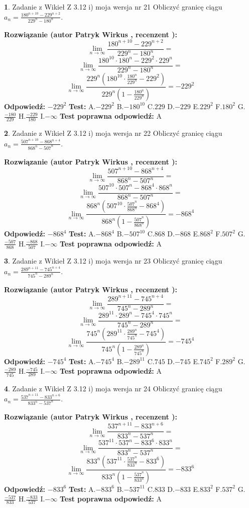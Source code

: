 \documentclass[12pt, a4paper]{article}
\theoremstyle{definition} %
\newtheorem{zad}{}
\newcommand{\zadStart}[1]{\begin{zad}#1\newline}
\newcommand{\zadStop}{\end{zad}}
\newcommand{\rozwStart}[2]{\noindent \textbf{Rozwiązanie (autor #1 , recenzent #2): }\newline}
\newcommand{\rozwStop}{\newline}
\newcommand{\odpStart}{\noindent \textbf{Odpowiedź:}\newline}
\newcommand{\odpStop}{\newline}
\newcommand{\testStart}{\noindent \textbf{Test:}\newline}
\newcommand{\testStop}{\newline}
\newcommand{\kluczStart}{\noindent \textbf{Test poprawna odpowiedź:}\newline}
\newcommand{\kluczStop}{\newline}
\begin{document}
\zadStart{Zadanie z Wikieł Z 3.12 i) moja wersja nr 21}
Obliczyć granicę ciągu $a_{n}=\frac{180^{n+10} - 229^{n+2}}{229^{n}-180^{n}}$.
\zadStop
\rozwStart{Patryk Wirkus}{}
$$\lim\limits_{n\to\infty}\frac{180^{n+10} - 229^{n+2}}{229^{n}-180^{n}}=$$
$$\lim\limits_{n\to\infty}\frac{180^{10} \cdot 180^{n} - 229^{2} \cdot 229^{n}}{229^{n}-180^{n}}=$$
$$\lim\limits_{n\to\infty}\frac{229^{n}(180^{10} \cdot \frac{180^{n}}{229^{n}} - 229^{2})}{229^{n}(1-\frac{180^{n}}{229^{n}})} = -229^{2}$$
\rozwStop
\odpStart
$-229^{2}$
\odpStop
\testStart
A.$-229^{2}$
B.$-180^{10}$
C.$229$
D.$-229$
E.$229^{2}$
F.$180^{2}$
G.$\frac{-180}{229}$
H.$\frac{-229}{180}$
I.$-\infty$
\testStop
\kluczStart
A
\kluczStop



\zadStart{Zadanie z Wikieł Z 3.12 i) moja wersja nr 22}
Obliczyć granicę ciągu $a_{n}=\frac{507^{n+10} - 868^{n+4}}{868^{n}-507^{n}}$.
\zadStop
\rozwStart{Patryk Wirkus}{}
$$\lim\limits_{n\to\infty}\frac{507^{n+10} - 868^{n+4}}{868^{n}-507^{n}}=$$
$$\lim\limits_{n\to\infty}\frac{507^{10} \cdot 507^{n} - 868^{4} \cdot 868^{n}}{868^{n}-507^{n}}=$$
$$\lim\limits_{n\to\infty}\frac{868^{n}(507^{10} \cdot \frac{507^{n}}{868^{n}} - 868^{4})}{868^{n}(1-\frac{507^{n}}{868^{n}})} = -868^{4}$$
\rozwStop
\odpStart
$-868^{4}$
\odpStop
\testStart
A.$-868^{4}$
B.$-507^{10}$
C.$868$
D.$-868$
E.$868^{2}$
F.$507^{2}$
G.$\frac{-507}{868}$
H.$\frac{-868}{507}$
I.$-\infty$
\testStop
\kluczStart
A
\kluczStop



\zadStart{Zadanie z Wikieł Z 3.12 i) moja wersja nr 23}
Obliczyć granicę ciągu $a_{n}=\frac{289^{n+11} - 745^{n+4}}{745^{n}-289^{n}}$.
\zadStop
\rozwStart{Patryk Wirkus}{}
$$\lim\limits_{n\to\infty}\frac{289^{n+11} - 745^{n+4}}{745^{n}-289^{n}}=$$
$$\lim\limits_{n\to\infty}\frac{289^{11} \cdot 289^{n} - 745^{4} \cdot 745^{n}}{745^{n}-289^{n}}=$$
$$\lim\limits_{n\to\infty}\frac{745^{n}(289^{11} \cdot \frac{289^{n}}{745^{n}} - 745^{4})}{745^{n}(1-\frac{289^{n}}{745^{n}})} = -745^{4}$$
\rozwStop
\odpStart
$-745^{4}$
\odpStop
\testStart
A.$-745^{4}$
B.$-289^{11}$
C.$745$
D.$-745$
E.$745^{2}$
F.$289^{2}$
G.$\frac{-289}{745}$
H.$\frac{-745}{289}$
I.$-\infty$
\testStop
\kluczStart
A
\kluczStop



\zadStart{Zadanie z Wikieł Z 3.12 i) moja wersja nr 24}
Obliczyć granicę ciągu $a_{n}=\frac{537^{n+11} - 833^{n+6}}{833^{n}-537^{n}}$.
\zadStop
\rozwStart{Patryk Wirkus}{}
$$\lim\limits_{n\to\infty}\frac{537^{n+11} - 833^{n+6}}{833^{n}-537^{n}}=$$
$$\lim\limits_{n\to\infty}\frac{537^{11} \cdot 537^{n} - 833^{6} \cdot 833^{n}}{833^{n}-537^{n}}=$$
$$\lim\limits_{n\to\infty}\frac{833^{n}(537^{11} \cdot \frac{537^{n}}{833^{n}} - 833^{6})}{833^{n}(1-\frac{537^{n}}{833^{n}})} = -833^{6}$$
\rozwStop
\odpStart
$-833^{6}$
\odpStop
\testStart
A.$-833^{6}$
B.$-537^{11}$
C.$833$
D.$-833$
E.$833^{2}$
F.$537^{2}$
G.$\frac{-537}{833}$
H.$\frac{-833}{537}$
I.$-\infty$
\testStop
\kluczStart
A
\kluczStop
\end{document}
